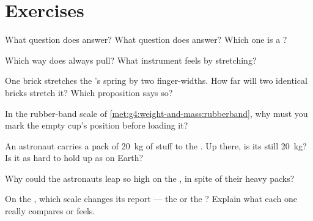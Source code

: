 \section{Exercises}

\begin{exercise}[$\star$]\label{exo:g4:weight-and-mass:1}
What question does  answer? What question does  answer?
Which one is a ?
\end{exercise}

\begin{exercise}[$\star$]\label{exo:g4:weight-and-mass:2}
Which way does  always pull? What instrument feels  by
stretching?
\end{exercise}

\begin{exercise}[$\star$]\label{exo:g4:weight-and-mass:3}
One brick stretches the 's spring by two finger-widths.
How far will two identical bricks stretch it? Which proposition
says so?
\end{exercise}

\begin{exercise}[$\star$]\label{exo:g4:weight-and-mass:4}
In the rubber-band scale of
\cref{met:g4:weight-and-mass:rubberband}, why must you mark the
empty cup's position before loading it?
\end{exercise}

\begin{exercise}[$\star$]\label{exo:g4:weight-and-mass:5}
An astronaut carries a pack of \qty{20}{kg} of stuff to the .
Up there, is its  still \qty{20}{kg}? Is it as hard to hold up
as on Earth?
\end{exercise}

\begin{exercise}[$\star$]\label{exo:g4:weight-and-mass:6}
Why could the astronauts leap so high on the , in spite of
their heavy packs?
\end{exercise}

\begin{exercise}[$\star$]\label{exo:g4:weight-and-mass:7}
On the , which scale changes its report --- the  or
the ? Explain what each one really compares or feels.
\end{exercise}


